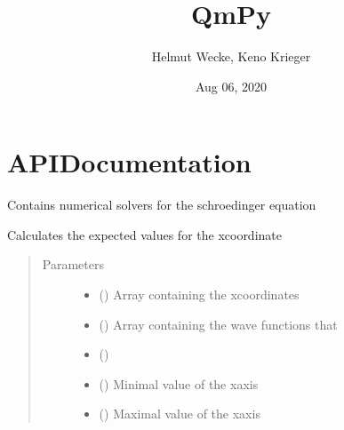 \documentclass[letterpaper,12,english]{sphinxmanual}
\title{QmPy}
\date{Aug 06, 2020}
\author{Helmut Wecke, Keno Krieger}
\begin{document}
\pagestyle{empty}
\sphinxmaketitle
\pagestyle{plain}
\sphinxtableofcontents
\pagestyle{normal}
\label{\detokenize{index::doc}}



\chapter{API\sphinxhyphen{}Documentation}
\label{\detokenize{api:module-solvers}}\label{\detokenize{api:api-documentation}}\label{\detokenize{api::doc}}
Contains numerical solvers for the schroedinger equation

\begin{fulllineitems}
\label{\detokenize{api:solvers.calculate_expval}}
Calculates the expected values for the x\sphinxhyphen{}coordinate
\begin{quote}\begin{description}
\item[{Parameters}] \leavevmode\begin{itemize}
\item {} 
 () \textendash{} Array containing the x\sphinxhyphen{}coordinates

\item {} 
 () \textendash{} Array containing the wave functions that

\item {} 
 () \textendash{} 

\item {} 
 () \textendash{} Minimal value of the x\sphinxhyphen{}axis

\item {} 
 () \textendash{} Maximal value of the x\sphinxhyphen{}axis


\end{itemize}
\end{description}
\end{quote}
\end{fulllineitems}
\end{document}
